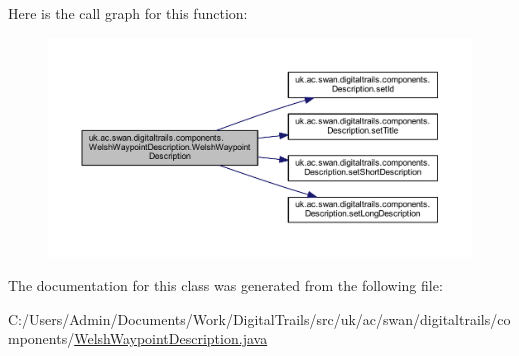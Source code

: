 Here is the call graph for this function\+:\nopagebreak
\begin{figure}[H]
\begin{center}
\leavevmode
\includegraphics[width=350pt]{classuk_1_1ac_1_1swan_1_1digitaltrails_1_1components_1_1_welsh_waypoint_description_abc99397f6f008f179abb0a89ab8c26a9_cgraph}
\end{center}
\end{figure}




The documentation for this class was generated from the following file\+:\begin{DoxyCompactItemize}
\item 
C\+:/\+Users/\+Admin/\+Documents/\+Work/\+Digital\+Trails/src/uk/ac/swan/digitaltrails/components/\hyperlink{_welsh_waypoint_description_8java}{Welsh\+Waypoint\+Description.\+java}\end{DoxyCompactItemize}
